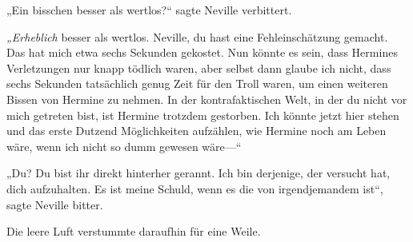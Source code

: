 „Ein bisschen besser als wertlos?“ sagte Neville verbittert.

\emph{„Erheblich} besser als wertlos. Neville, du hast eine Fehleinschätzung gemacht. Das hat mich etwa sechs Sekunden gekostet. Nun könnte es sein, dass Hermines Verletzungen nur knapp tödlich waren, aber selbst dann glaube ich nicht, dass sechs Sekunden tatsächlich genug Zeit für den Troll waren, um einen weiteren Bissen von Hermine zu nehmen. In der kontrafaktischen Welt, in der du nicht vor mich getreten bist, ist Hermine trotzdem gestorben. Ich könnte jetzt hier stehen und das erste Dutzend Möglichkeiten aufzählen, wie Hermine noch am Leben wäre, wenn ich nicht so dumm gewesen wäre—“

„Du? Du bist ihr direkt hinterher gerannt. Ich bin derjenige, der versucht hat, dich aufzuhalten. Es ist meine Schuld, wenn es die von irgendjemandem ist“, sagte Neville bitter.

Die leere Luft verstummte daraufhin für eine Weile.

